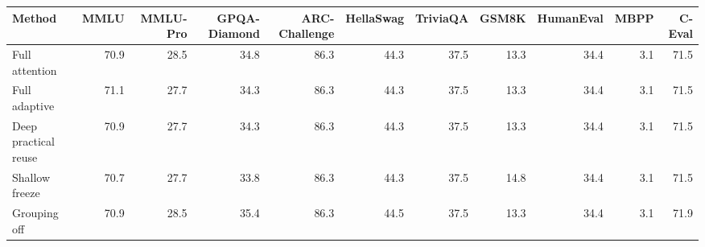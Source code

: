 \begin{tabular}{lrrrrrrrrrr}
\toprule
Method & MMLU & MMLU-Pro & GPQA-Diamond & ARC-Challenge & HellaSwag & TriviaQA & GSM8K & HumanEval & MBPP & C-Eval \\
\midrule
Full attention & 70.9 & 28.5 & 34.8 & 86.3 & 44.3 & 37.5 & 13.3 & 34.4 & 3.1 & 71.5 \\
Full adaptive & 71.1 & 27.7 & 34.3 & 86.3 & 44.3 & 37.5 & 13.3 & 34.4 & 3.1 & 71.5 \\
Deep practical reuse & 70.9 & 27.7 & 34.3 & 86.3 & 44.3 & 37.5 & 13.3 & 34.4 & 3.1 & 71.5 \\
Shallow freeze & 70.7 & 27.7 & 33.8 & 86.3 & 44.3 & 37.5 & 14.8 & 34.4 & 3.1 & 71.5 \\
Grouping off & 70.9 & 28.5 & 35.4 & 86.3 & 44.5 & 37.5 & 13.3 & 34.4 & 3.1 & 71.9 \\
\bottomrule
\end{tabular}
